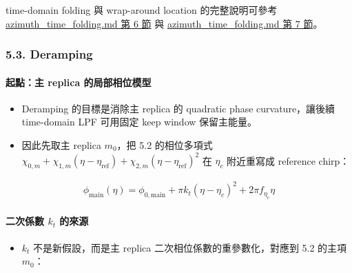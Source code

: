 \documentclass[10pt]{article}
\providecommand{\tightlist}{%
  \setlength{\itemsep}{0pt}\setlength{\parskip}{0pt}}
\begin{document}
time-domain folding 與 wrap-around location 的完整說明可參考
\href{./azimuth_time_folding.md\#6-circular-convolution-and-wrap-around}{azimuth\_time\_folding.md 第 6 節}
與
\href{./azimuth_time_folding.md\#7-wrap-around-location-formula}{azimuth\_time\_folding.md 第 7 節}。

\hypertarget{deramping-1}{%
\subsubsection{5.3. Deramping}\label{deramping-1}}

\hypertarget{ux8d77ux9edeux4e3b-replica-ux7684ux5c40ux90e8ux76f8ux4f4dux6a21ux578b}{%
\paragraph{起點：主 replica
的局部相位模型}\label{ux8d77ux9edeux4e3b-replica-ux7684ux5c40ux90e8ux76f8ux4f4dux6a21ux578b}}

\begin{itemize}
\tightlist
\item
  Deramping 的目標是消除主 replica 的 quadratic phase curvature，讓後續
  time-domain LPF 可用固定 keep window 保留主能量。
\item
  因此先取主 replica \(m_0\)，把 5.2 的相位多項式
  \(\chi_{0,m}+\chi_{1,m}(\eta-\eta_{\mathrm{ref}})+\chi_{2,m}(\eta-\eta_{\mathrm{ref}})^2\)
  在 \(\eta_c\) 附近重寫成 reference chirp：
\end{itemize}

\begin{equation}
\begin{aligned}
\phi_{\mathrm{main}}(\eta)=\phi_{0,\mathrm{main}}+\pi k_t(\eta-\eta_c)^2+2\pi f_{\eta_c}\eta
\end{aligned}
\end{equation}

\hypertarget{ux4e8cux6b21ux4fc2ux6578-k_t-ux7684ux4f86ux6e90}{%
\paragraph{\texorpdfstring{二次係數 \(k_t\)
的來源}{二次係數 k\_t 的來源}}\label{ux4e8cux6b21ux4fc2ux6578-k_t-ux7684ux4f86ux6e90}}

\begin{itemize}
\tightlist
\item
  \(k_t\) 不是新假設，而是主 replica 二次相位係數的重參數化，對應到 5.2
  的主項 \(m_0\)：
\end{itemize}
\end{document}
